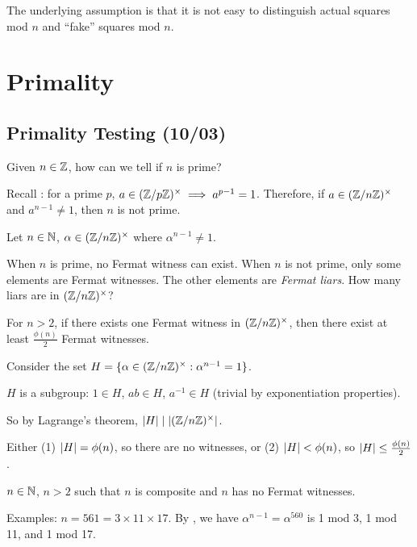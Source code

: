 \documentclass[notes]{agony}
\newcommand{\mgrp}[1]{(\Z/#1\Z)^\times}
\begin{document}
The underlying assumption is that it is not easy to distinguish
actual squares mod $n$ and ``fake'' squares mod $n$.

\chapter{Primality}

\section{Primality Testing (10/03)}

Given $n \in \mathbb{Z}$, how can we tell if $n$ is prime?

\begin{lemma}
  Recall \FLT{}: for a prime $p$, $a \in (\mathbb{Z}/p\mathbb{Z})^\times \implies a^{p-1} = 1$.
  Therefore, if $a \in (\mathbb{Z}/n\mathbb{Z})^\times$ and $a^{n-1} \neq 1$,
  then $n$ is not prime.
\end{lemma}

\begin{defn}
  Let $n \in \mathbb{N}$, $\alpha \in (\mathbb{Z}/n\mathbb{Z})^\times$ where $\alpha^{n-1} \neq 1$.
\end{defn}

When $n$ is prime, no Fermat witness can exist.
When $n$ is not prime, only some elements are Fermat witnesses.
The other elements are \emph{Fermat liars}.
How many liars are in $(\mathbb{Z}/n\mathbb{Z})^\times$?

\begin{theorem}
  For $n > 2$, if there exists one Fermat witness in $(\mathbb{Z}/n\mathbb{Z})^\times$,
  then there exist at least $\frac{\phi(n)}{2}$ Fermat witnesses.
\end{theorem}
\begin{prf}
  Consider the set $H=\{ \alpha \in \mgrp{n} : \alpha^{n-1} = 1\}$.

  $H$ is a subgroup: $1 \in H$, $ab \in H$, $a^{-1} \in H$ (trivial by exponentiation properties).

  So by Lagrange's theorem, $\abs{H} \mid \abs{\mgrp{n}}$.

  Either (1) $\abs{H} = \phi(n)$, so there are no witnesses,
  or (2) $\abs{H} < \phi(n)$, so $\abs{H} \leq \frac{\phi(n)}{2}$.
\end{prf}

\begin{defn}
  $n \in \mathbb{N}$, $n > 2$ such that $n$ is composite and $n$ has no Fermat witnesses.
\end{defn}
Examples: $n = 561 = 3 \times 11 \times 17$.
By \FLT{}, we have $\alpha^{n-1} = \alpha^{560}$ is 1 mod 3, 1 mod 11, and 1 mod 17.
\end{document}
